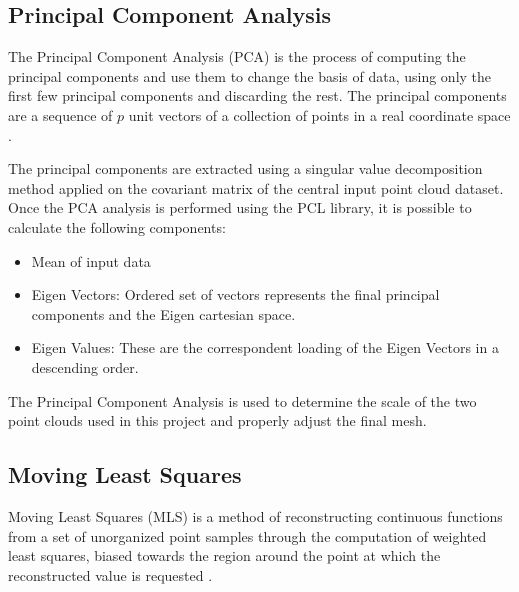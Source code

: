 \documentclass[12pt]{report}
\begin{document}
\subsection{Principal Component Analysis}
\label{section:Principal Component Analysis}
The Principal Component Analysis (PCA) is the process of computing the principal components and use them to change the basis of data, using only the first few principal components
and discarding the rest. The principal components are a sequence of $p$ unit vectors of a collection of points in a real coordinate space .

The principal components are extracted using a singular value decomposition method applied on the covariant matrix of the central input point cloud dataset.
Once the PCA analysis is performed using the PCL library, it is possible to calculate the following components:
\begin{itemize}
  \item Mean of input data
  \item Eigen Vectors: Ordered set of vectors represents the final principal components and the Eigen cartesian space.
  \item Eigen Values: These are the correspondent loading of the Eigen Vectors in a descending order.
\end{itemize}

The Principal Component Analysis is used to determine the scale of the two point clouds used in this project and properly adjust the final mesh.





\subsection{Moving Least Squares}
\label{section:Moving Least Squares}

Moving Least Squares (MLS) is a method of reconstructing continuous functions from a set of unorganized point samples through the computation of weighted least squares, 
biased towards the region around the point at which the reconstructed value is requested .
\end{document}
